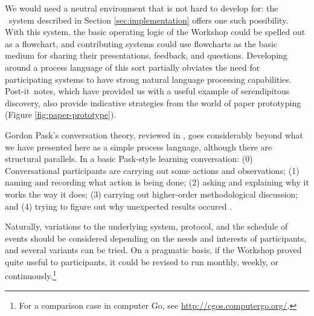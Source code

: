 We would need a neutral environment that is not hard to develop for:
the \Fw\ system described in Section \ref{sec:implementation}
offers one such possibility.  With this system, the basic operating
logic of the Workshop could be spelled out as a flowchart, and
contributing systems could use flowcharts as the basic medium for
sharing their presentations, feedback, and questions.  Developing
around a process language of this sort partially obviates the need for
participating systems to have strong natural language processing
capabilities.  
%
Post-it\texttrademark\ notes, which have provided us with a useful
example of serendipitous discovery, also provide indicative strategies
from the world of paper prototyping (Figure \ref{fig:paper-prototype}).

Gordon Pask's conversation theory, reviewed in
\cite{conversation-theory-review,boyd2004conversation}, goes
considerably beyond what we have presented here as a simple process
language, although there are structural parallels.  In a basic
Pask-style learning conversation: (0) Conversational participants are
carrying out some actions and observations; (1) naming and recording
what action is being done; (2) asking and explaining why it works the
way it does; (3) carrying out higher-order methodological discussion;
and (4) trying to figure out why unexpected results occured \cite[p. 190]{boyd2004conversation}.

Naturally, variations to the underlying system, protocol, and the
schedule of events should be considered depending on the needs and
interests of participants, and several variants can be tried.  On a
pragmatic basis, if the Workshop proved quite useful to participants,
it could be revised to run monthly, weekly, or
continuously.\footnote{For a comparison case in computer Go, see
  \url{http://cgos.computergo.org/}.}

